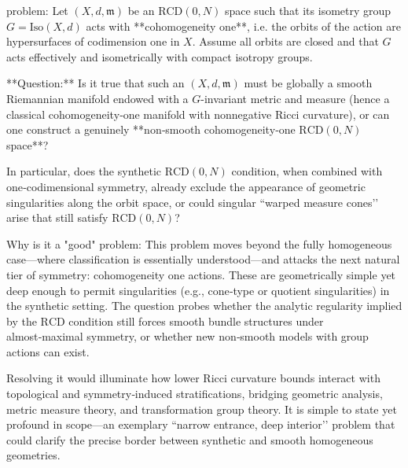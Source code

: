 problem:  
Let \((X,d,\mathfrak{m})\) be an \(\mathrm{RCD}(0,N)\) space such that its isometry group \(G = \mathrm{Iso}(X,d)\) acts with **cohomogeneity one**, i.e. the orbits of the action are hypersurfaces of codimension one in \(X\). Assume all orbits are closed and that \(G\) acts effectively and isometrically with compact isotropy groups.  

**Question:**  
Is it true that such an \((X,d,\mathfrak{m})\) must be globally a smooth Riemannian manifold endowed with a \(G\)-invariant metric and measure (hence a classical cohomogeneity‑one manifold with nonnegative Ricci curvature), or can one construct a genuinely **non‑smooth cohomogeneity‑one \(\mathrm{RCD}(0,N)\) space**?  

In particular, does the synthetic \(\mathrm{RCD}(0,N)\) condition, when combined with one‑codimensional symmetry, already exclude the appearance of geometric singularities along the orbit space, or could singular “warped measure cones’’ arise that still satisfy \(\mathrm{RCD}(0,N)\)?  

Why is it a "good" problem:  
This problem moves beyond the fully homogeneous case—where classification is essentially understood—and attacks the next natural tier of symmetry: cohomogeneity one actions. These are geometrically simple yet deep enough to permit singularities (e.g., cone‑type or quotient singularities) in the synthetic setting. The question probes whether the analytic regularity implied by the \(\mathrm{RCD}\) condition still forces smooth bundle structures under almost‑maximal symmetry, or whether new non‑smooth models with group actions can exist.  

Resolving it would illuminate how lower Ricci curvature bounds interact with topological and symmetry‑induced stratifications, bridging geometric analysis, metric measure theory, and transformation group theory. It is simple to state yet profound in scope—an exemplary “narrow entrance, deep interior’’ problem that could clarify the precise border between synthetic and smooth homogeneous geometries.
